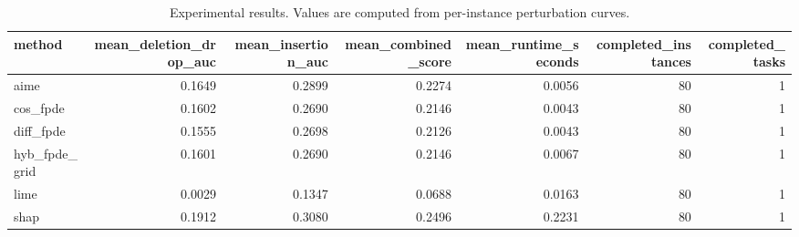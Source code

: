 \begin{table}[t]
\caption{Experimental results. Values are computed from per-instance perturbation curves.}
\label{tab:main_results_computed}
\centering
\begin{tabular}{lrrrrrr}
\toprule
method & mean\_deletion\_drop\_auc & mean\_insertion\_auc & mean\_combined\_score & mean\_runtime\_seconds & completed\_instances & completed\_tasks \\
\midrule
aime & 0.1649 & 0.2899 & 0.2274 & 0.0056 & 80 & 1 \\
cos\_fpde & 0.1602 & 0.2690 & 0.2146 & 0.0043 & 80 & 1 \\
diff\_fpde & 0.1555 & 0.2698 & 0.2126 & 0.0043 & 80 & 1 \\
hyb\_fpde\_grid & 0.1601 & 0.2690 & 0.2146 & 0.0067 & 80 & 1 \\
lime & 0.0029 & 0.1347 & 0.0688 & 0.0163 & 80 & 1 \\
shap & 0.1912 & 0.3080 & 0.2496 & 0.2231 & 80 & 1 \\
\bottomrule
\end{tabular}

\end{table}
